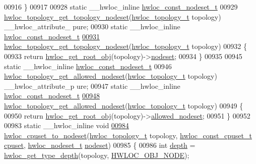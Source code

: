\begin{DoxyCode}
{{00916 \}
00917 
00928 \textcolor{keyword}{static} \_\_hwloc\_inline \hyperlink{a00040_ga2f5276235841ad66a79bedad16a5a10c}{hwloc_const_nodeset_t}
00929 \hyperlink{a00061_ga78f80a3c04718ca273791a1071512031}{hwloc_topology_get_topology_nodeset}(\hyperlink{a00039_ga9d1e76ee15a7dee158b786c30b6a6e38}{hwloc_topology_t} topology) \_\_hwloc\_attribute\_
      pure;
00930 \textcolor{keyword}{static} \_\_hwloc\_inline \hyperlink{a00040_ga2f5276235841ad66a79bedad16a5a10c}{hwloc_const_nodeset_t}
\hypertarget{a00031_source_l00931}{}\hyperlink{a00061_ga78f80a3c04718ca273791a1071512031}{00931} \hyperlink{a00061_ga78f80a3c04718ca273791a1071512031}{hwloc_topology_get_topology_nodeset}(\hyperlink{a00039_ga9d1e76ee15a7dee158b786c30b6a6e38}{hwloc_topology_t} topology)
00932 \{
00933   \textcolor{keywordflow}{return} \hyperlink{a00053_gadbf58f6e187efbdb3cd9a8e30311b7d7}{hwloc_get_root_obj}(topology)->\hyperlink{a00016_a08f0d0e16c619a6e653526cbee4ffea3}{nodeset};
00934 \}
00935 
00945 \textcolor{keyword}{static} \_\_hwloc\_inline \hyperlink{a00040_ga2f5276235841ad66a79bedad16a5a10c}{hwloc_const_nodeset_t}
00946 \hyperlink{a00061_ga13915b8e074f59fbdf8f973739509293}{hwloc_topology_get_allowed_nodeset}(\hyperlink{a00039_ga9d1e76ee15a7dee158b786c30b6a6e38}{hwloc_topology_t} topology) \_\_hwloc\_attribute\_p
      ure;
00947 \textcolor{keyword}{static} \_\_hwloc\_inline \hyperlink{a00040_ga2f5276235841ad66a79bedad16a5a10c}{hwloc_const_nodeset_t}
\hypertarget{a00031_source_l00948}{}\hyperlink{a00061_ga13915b8e074f59fbdf8f973739509293}{00948} \hyperlink{a00061_ga13915b8e074f59fbdf8f973739509293}{hwloc_topology_get_allowed_nodeset}(\hyperlink{a00039_ga9d1e76ee15a7dee158b786c30b6a6e38}{hwloc_topology_t} topology)
00949 \{
00950   \textcolor{keywordflow}{return} \hyperlink{a00053_gadbf58f6e187efbdb3cd9a8e30311b7d7}{hwloc_get_root_obj}(topology)->\hyperlink{a00016_a19e3d0a5951a7510fc4fc4722a9bf531}{allowed_nodeset};
00951 \}
00952 
00983 \textcolor{keyword}{static} \_\_hwloc\_inline \textcolor{keywordtype}{void}
\hypertarget{a00031_source_l00984}{}\hyperlink{a00062_ga60ecc4ae480c28b5fbd34aca4fc37daa}{00984} \hyperlink{a00062_ga60ecc4ae480c28b5fbd34aca4fc37daa}{hwloc_cpuset_to_nodeset}(\hyperlink{a00039_ga9d1e76ee15a7dee158b786c30b6a6e38}{hwloc_topology_t} topology, \hyperlink{a00040_ga1f784433e9b606261f62d1134f6a3b25}{hwloc_const_cpuset_t} \hyperlink{a00016_a67925e0f2c47f50408fbdb9bddd0790f}{cpuset}, 
      \hyperlink{a00040_ga37e35730fa7e775b5bb0afe893d6d508}{hwloc_nodeset_t} \hyperlink{a00016_a08f0d0e16c619a6e653526cbee4ffea3}{nodeset})
00985 \{
00986         \textcolor{keywordtype}{int} \hyperlink{a00016_a9d82690370275d42d652eccdea5d3ee5}{depth} = \hyperlink{a00046_gaea7c64dd59467f5201ba87712710b14d}{hwloc_get_type_depth}(topology, \hyperlink{a00041_ggacd37bb612667dc437d66bfb175a8dc55aaf0964881117bdedf1a5e9332cd120dd}{HWLOC_OBJ_NODE});
}}
\end{DoxyCode}
